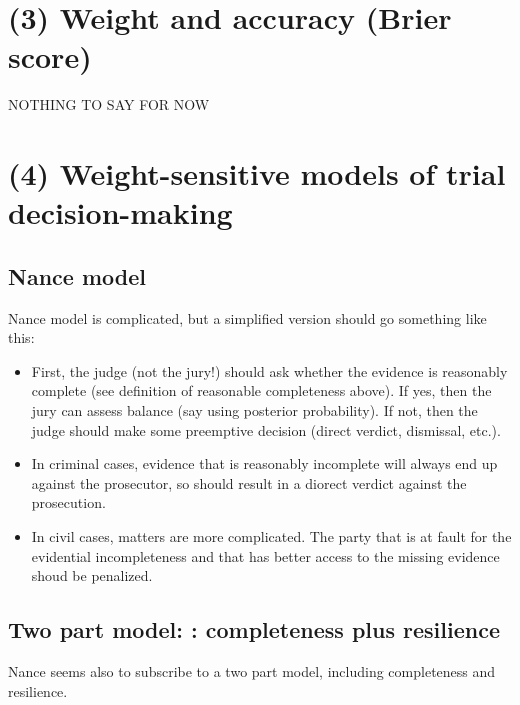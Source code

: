 \documentclass[
  10pt,
  dvipsnames,enabledeprecatedfontcommands]{scrartcl}
\begin{document}
\hypertarget{weight-and-accuracy-brier-score}{%
\section{(3) Weight and accuracy (Brier
score)}\label{weight-and-accuracy-brier-score}}

NOTHING TO SAY FOR NOW

\hypertarget{weight-sensitive-models-of-trial-decision-making}{%
\section{(4) Weight-sensitive models of trial
decision-making}\label{weight-sensitive-models-of-trial-decision-making}}

\hypertarget{nance-model}{%
\subsection{Nance model}\label{nance-model}}

Nance model is complicated, but a simplified version should go something
like this:

\begin{itemize}
\item
  First, the judge (not the jury!) should ask whether the evidence is
  reasonably complete (see definition of reasonable completeness above).
  If yes, then the jury can assess balance (say using posterior
  probability). If not, then the judge should make some preemptive
  decision (direct verdict, dismissal, etc.).
\item
  In criminal cases, evidence that is reasonably incomplete will always
  end up against the prosecutor, so should result in a diorect verdict
  against the prosecution.
\item
  In civil cases, matters are more complicated. The party that is at
  fault for the evidential incompleteness and that has better access to
  the missing evidence shoud be penalized.
\end{itemize}

\hypertarget{two-part-model-completeness-plus-resilience}{%
\subsection{Two part model: : completeness plus
resilience}\label{two-part-model-completeness-plus-resilience}}

Nance seems also to subscribe to a two part model, including
completeness and resilience.
\end{document}
